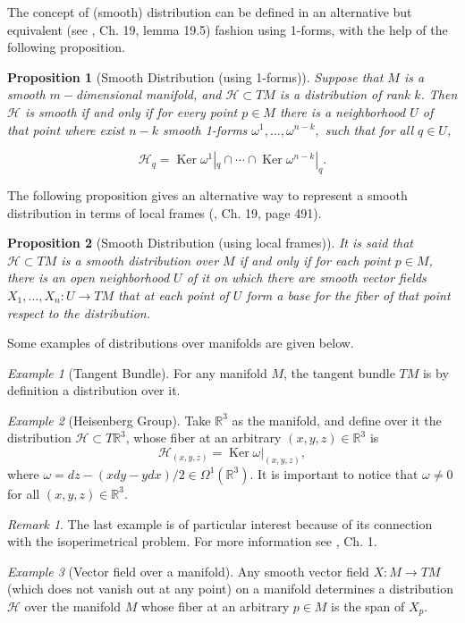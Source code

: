 \documentclass[12pt, letterpaper, reqno]{amsart}
\theoremstyle{definition}
\theoremstyle{plain}
\newtheorem{prop}{Proposition}
\theoremstyle{remark}
\newtheorem{ex}{Example}
\newtheorem{rem}{Remark}
\begin{document}
The concept of (smooth) distribution can be defined in an alternative but equivalent (see \cite{lee2003introduction}, Ch. 19, lemma 19.5) fashion using 1-forms, with the help of the following proposition.

\begin{prop}[Smooth Distribution (using 1-forms)]
	Suppose that $ M $ is a smooth $ m- $dimensional manifold, and $ \mathcal{H} \subset TM$ is a distribution of rank $k$. Then $ \mathcal{H} $ is smooth if and only if for every point $ p\in M $ there is a neighborhood $ U $ of that point where exist $n-k$ smooth 1-forms $ \omega^1,\dots,\omega^{n-k}, $ such that for all $ q\in U $,

	$$ \mathcal{H}_q = \operatorname{Ker} \omega^1|_q\cap \cdots \cap\operatorname{Ker} \omega^{n-k}|_q.  $$ 
\end{prop}

The following proposition gives an alternative way to represent a smooth distribution in terms of local frames (\cite{lee2003introduction}, Ch. 19, page 491).

\begin{prop} [Smooth Distribution (using local frames)]
	It is said that $ \mathcal{H}\subset TM $ is a smooth distribution over $M  $ if and only if  for each point $ p\in M $, there is an open neighborhood $ U $ of it on which there are smooth vector fields $ X_1,\dots,X_n: U \rightarrow {TM} $ that at each point of $ U $ form a base for the fiber of that point respect to the distribution.
\end{prop}
Some examples of distributions over manifolds are given below.
\begin{ex}[Tangent Bundle]
	For any manifold $ M $, the tangent bundle $ TM $ is by definition a distribution over it. 
\end{ex}
\begin{ex}[Heisenberg Group]\label{ex:heis_group}
	Take $ \mathbb{R} ^3 $ as the manifold, and define over it the distribution $ \mathcal{H}\subset T \mathbb{R} ^3 $, whose fiber at an arbitrary $ (x,y,z)\in \mathbb{R}^3  $ is   
	$$ \mathcal{H}_{(x,y,z)} = \operatorname{Ker} \omega|_{(x,y,z)},$$
	where $ \omega = dz-(x dy-y dx)/2\in\Omega^1( \mathbb{R}^3).$ It is important to notice that $ \omega\neq 0 $ for all $ (x,y,z)\in \mathbb{R}^3. $ 
\end{ex}
\begin{rem}
	The last example is of particular interest because of its connection with the isoperimetrical problem. For more information see \cite{montgomery2002tour}, Ch. 1.
\end{rem}
\begin{ex}[Vector field over a manifold]\label{ex:vect_field}
Any smooth vector field $ X: M \rightarrow {TM} $ (which does not vanish out at any point) on a manifold determines a distribution $ \mathcal{H}$ over the manifold $ M $ whose fiber at an arbitrary $ p\in M $ is the span of $ X_p. $
\end{ex}
\end{document}
